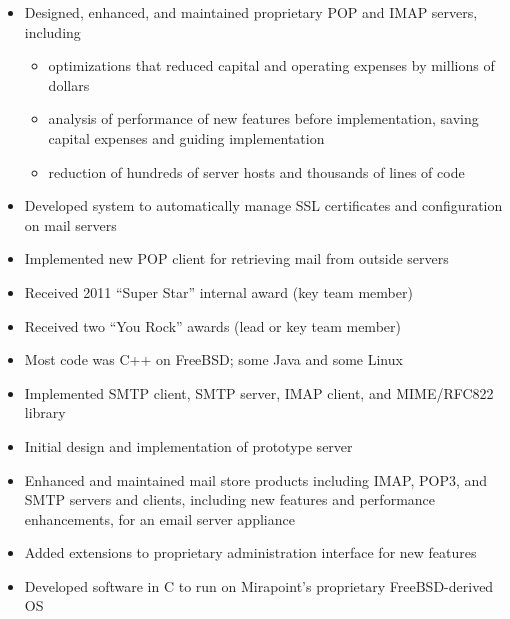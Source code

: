 \documentclass[letterpaper,12pt,twoside]{article}
\begin{document}
\vspace{-18pt}
\begin{itemize}
\item Designed, enhanced, and maintained proprietary POP and IMAP
  servers, including
  \begin{itemize}
  \item optimizations that reduced capital and operating expenses
    by millions of dollars
  \item analysis of performance of new features before
    implementation, saving capital expenses and guiding implementation
  \item reduction of hundreds of server hosts and thousands of lines of code
  \end{itemize}
\item Developed system to automatically manage SSL certificates and
  configuration on mail servers
\item Implemented new POP client for retrieving mail from outside servers
\item Received 2011 ``Super Star'' internal award (key team member)
\item Received two ``You Rock'' awards (lead or key team member)
\item Most code was C++ on FreeBSD; some Java and some Linux
\end{itemize}

\vspace{-18pt}
\begin{itemize}
\item Implemented SMTP client, SMTP server, IMAP client, and
  MIME/RFC822 library
\item Initial design and implementation of prototype server
\end{itemize}

\pagebreak

\vspace{-18pt}
\begin{itemize}
\item Enhanced and maintained mail store products including
  IMAP, POP3, and SMTP servers and clients, including new features
  and performance enhancements, for an email server appliance
\item Added extensions to proprietary administration interface for new
  features
\item Developed software in C to run on Mirapoint’s proprietary
  FreeBSD-derived OS
\end{itemize}
\end{document}
